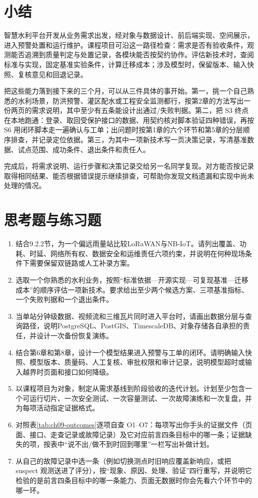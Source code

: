 \section*{小结}

智慧水利平台开发从业务需求出发，经对象与数据设计、前后端实现、空间展示，进入预警处置和运行维护。课程项目可沿这一路径检查：需求是否有验收条件，观测能否追溯到质量判定与处置记录，各模块能否按契约协作。评估新技术时，查阅标准与实现，固定基准实验条件，计算迁移成本；涉及模型时，保留版本、输入快照、复核意见和回退记录。

把这些能力落到接下来的三个月，可以从三件具体的事开始。第一，挑一个自己熟悉的水利场景，防洪预警、灌区配水或工程安全监测都行，按第2章的方法写出一份两页的需求说明，其中至少有五条能设计出通过/失败判据。第二，把 S3 终点在本地跑通：登录、取回受保护接口的数据、用契约核对脚本验证四种错误，再按 S6 用闭环脚本走一遍确认与工单；出问题时按第1章的六个环节和第5章的分层顺序排查，并记录定位依据。第三，为其中一项新技术写一页决策记录，写清基准数据、试点范围、成功条件、退出条件和责任人。

完成后，将需求说明、运行步骤和决策记录交给另一名同学复现。对方能否按记录取得相同结果、能否根据错误提示继续排查，可帮助你发现文档遗漏和实现中尚未处理的情况。
\section*{思考题与练习题}

\begin{enumerate}
\item 结合9.2.2节，为一个偏远雨量站比较LoRaWAN与NB-IoT。请列出覆盖、功耗、时延、网络所有权、数据安全和运维责任六项约束，并说明在何种现场条件下需要保留双链路或人工补录方案。
\item 选取一个你熟悉的水利业务，按照“标准依据—开源实现—可复现基准—迁移成本”的顺序评估一项新技术。要求给出至少两个候选方案、三项基准指标、一个失败判据和一个退出条件。
\item 当单站分钟级数据、视频流和三维瓦片同时进入平台时，请画出数据分层与查询路径，说明PostgreSQL、PostGIS、TimescaleDB、对象存储各自承担的责任，并设计一次备份恢复演练。
\item 结合第6章和第8章，设计一个模型结果进入预警与工单的闭环。请明确输入快照、模型版本、质量码、人工复核、审批权限和审计记录，说明模型超时或输入越界时页面和接口如何降级。
\item 以课程项目为对象，制定从需求基线到阶段验收的迭代计划。计划至少包含一个可运行切片、一次安全测试、一次容量测试、一次故障演练和一次复盘，并为每项活动指定证据格式。
\item 对照表\ref{tab:ch09-outcomes}逐项自查 O1--O7：每项写出你手头的证据文件（页面、接口、走查记录或故障记录）及它对应前言四条目标中的哪一条；证据缺失的项，按表中“说不出/做不到时回到哪里”一栏写出补做计划。
\item 从自己的故障记录中选一条（例如切换测点时旧响应覆盖新响应，或把 suspect 观测送进了评分），按“现象、原因、处理、验证”四行重写，并说明它检验的是前言四条目标中的哪一条能力、页面无数据时你会先看六个环节中的哪一环。
\end{enumerate}

